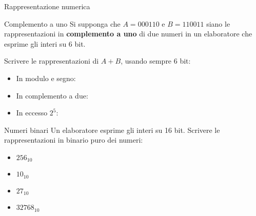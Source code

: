 \documentclass[11pt]{article}
\begin{document}
\begin{quiz}{Rappresentazione numerica}
\begin{cloze}[points=1,shuffle=false]{Complemento a uno}
Si supponga che $A = 000110$ e $B = 110011$ siano le rappresentazioni in \textbf{complemento a uno} di due numeri in un elaboratore che esprime gli interi su 6 bit.

Scrivere le rappresentazioni di $A+B$, usando sempre 6 bit:

\begin{itemize}
\item In modulo e segno: 
\item In complemento a due: 
\item In eccesso $2^5$: 
\end{itemize}
\end{cloze}

\begin{cloze}[points=1,shuffle=false]{Numeri binari}
Un elaboratore esprime gli interi su 16 bit. Scrivere le rappresentazioni in binario puro dei numeri:

\begin{itemize}
\item $256_{10}$ 
\item $10_{10}$  
\item $27_{10}$  
\item $32768_{10}$ 
\end{itemize}
\end{cloze}


\end{quiz}
\end{document}
